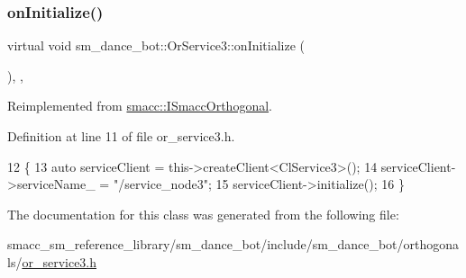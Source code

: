 \subsubsection{\texorpdfstring{on\+Initialize()}{onInitialize()}}
{\footnotesize\ttfamily virtual void sm\+\_\+dance\+\_\+bot\+::\+Or\+Service3\+::on\+Initialize (\begin{DoxyParamCaption}{ }\end{DoxyParamCaption})\hspace{0.3cm}{\ttfamily [inline]}, {\ttfamily [override]}, {\ttfamily [virtual]}}



Reimplemented from \hyperlink{classsmacc_1_1ISmaccOrthogonal_a6bb31c620cb64dd7b8417f8705c79c7a}{smacc\+::\+I\+Smacc\+Orthogonal}.



Definition at line 11 of file or\+\_\+service3.\+h.


\begin{DoxyCode}
12     \{
13         \textcolor{keyword}{auto} serviceClient = this->createClient<ClService3>();
14         serviceClient->serviceName\_ = \textcolor{stringliteral}{"/service\_node3"};
15         serviceClient->initialize();
16     \}
\end{DoxyCode}


The documentation for this class was generated from the following file\+:\begin{DoxyCompactItemize}
\item 
smacc\+\_\+sm\+\_\+reference\+\_\+library/sm\+\_\+dance\+\_\+bot/include/sm\+\_\+dance\+\_\+bot/orthogonals/\hyperlink{include_2sm__dance__bot_2orthogonals_2or__service3_8h}{or\+\_\+service3.\+h}\end{DoxyCompactItemize}
